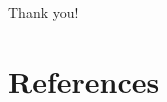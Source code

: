\documentclass{beamer}
\begin{document}
\begin{frame}[noframenumbering]
\Large \centering
\textcolor{blue_pres}{} Thank you!
\end{frame}

\section{References}
\end{document}
